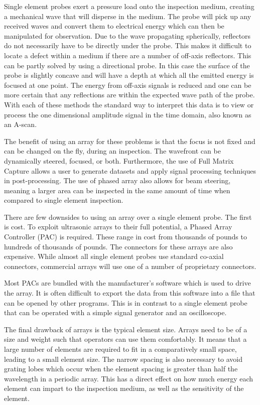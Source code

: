 Single element probes exert a pressure load onto the inspection medium, creating a mechanical wave that will disperse in the medium. The probe will pick up any received waves and convert them to electrical energy which can then be manipulated for observation. Due to the wave propagating spherically, reflectors do not necessarily have to be directly under the probe\cite{alleyne_optimization_1992}. This makes it difficult to locate a defect within a medium if there are a number of off-axis reflectors\cite{lazaro_influence_2002}. This can be partly solved by using a directional probe. In this case the surface of the probe is slightly concave and will have a depth at which all the emitted energy is focused at one point\cite{thurstone_ultrasonic_1965}. The energy from off-axis signals is reduced and one can be more certain that any reflections are within the expected wave path of the probe\cite{buddemeyer_physics_1975}. With each of these methods the standard way to interpret this data is to view or process the one dimensional amplitude signal in the time domain, also known as an A-scan\cite{santodomingo-rubido_new_2002}.

The benefit of using an array for these problems is that the focus is not fixed and can be changed on the fly, during an inspection. The wavefront can be dynamically steered, focused, or both. Furthermore, the use of Full Matrix Capture allows a user to generate datasets and apply signal processing techniques in post-processing. The use of phased array also allows for beam steering, meaning a larger area can be inspected in the same amount of time when compared to single element inspection.

There are few downsides to using an array over a single element probe. The first is cost. To exploit ultrasonic arrays to their full potential, a Phased Array Controller (PAC) is required. These range in cost from thousands of pounds to hundreds of thousands of pounds. The connectors for these arrays are also expensive. While almost all single element probes use standard co-axial connectors, commercial arrays will use one of a number of proprietary connectors.

Most PACs are bundled with the manufacturer's software which is used to drive the array. It is often difficult to export the data from this software into a file that can be opened by other programs. This is in contrast to a single element probe that can be operated with a simple signal generator and an oscilloscope.

The final drawback of arrays is the typical element size. Arrays need to be of a size and weight such that operators can use them comfortably. It means that a large number of elements are required to fit in a comparatively small space, leading to a small element size. The narrow spacing is also necessary to avoid grating lobes which occur when the element spacing is greater than half the wavelength in a periodic array. This has a direct effect on how much energy each element can impart to the inspection medium, as well as the sensitivity of the element.

